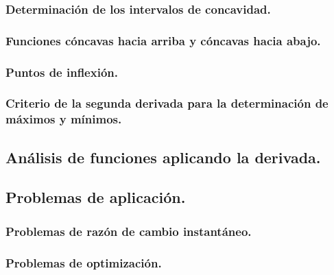 \subsubsection{Determinación de los intervalos de concavidad.}
\subsubsection{Funciones cóncavas hacia arriba y cóncavas hacia abajo.}
\subsubsection{Puntos de inflexión.}
\subsubsection{Criterio de la segunda derivada para la determinación de máximos y mínimos.}
\subsection{Análisis de funciones aplicando la derivada.}
\subsection{Problemas de aplicación.}
\subsubsection{Problemas de razón de cambio instantáneo.}
\subsubsection{Problemas de optimización.}
